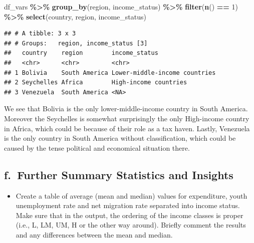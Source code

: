 \documentclass[
]{article}
\newenvironment{Shaded}{\begin{snugshade}}{\end{snugshade}}
\newcommand{\DecValTok}[1]{\textcolor[rgb]{0.00,0.00,0.81}{#1}}
\newcommand{\FunctionTok}[1]{\textcolor[rgb]{0.13,0.29,0.53}{\textbf{#1}}}
\newcommand{\NormalTok}[1]{#1}
\newcommand{\SpecialCharTok}[1]{\textcolor[rgb]{0.81,0.36,0.00}{\textbf{#1}}}
\providecommand{\tightlist}{%
  \setlength{\itemsep}{0pt}\setlength{\parskip}{0pt}}
\begin{document}
\begin{Shaded}
\begin{Highlighting}[]
\NormalTok{df\_vars }\SpecialCharTok{\%\textgreater{}\%} 
  \FunctionTok{group\_by}\NormalTok{(region, income\_status) }\SpecialCharTok{\%\textgreater{}\%}
  \FunctionTok{filter}\NormalTok{(}\FunctionTok{n}\NormalTok{() }\SpecialCharTok{==} \DecValTok{1}\NormalTok{) }\SpecialCharTok{\%\textgreater{}\%}
  \FunctionTok{select}\NormalTok{(country, region, income\_status)}
\end{Highlighting}
\end{Shaded}

\begin{verbatim}
## # A tibble: 3 x 3
## # Groups:   region, income_status [3]
##   country    region        income_status                
##   <chr>      <chr>         <chr>                        
## 1 Bolivia    South America Lower-middle-income countries
## 2 Seychelles Africa        High-income countries        
## 3 Venezuela  South America <NA>
\end{verbatim}

We see that Bolivia is the only lower-middle-income country in South
America. Moreover the Seychelles is somewhat surprisingly the only
High-income country in Africa, which could be because of their role as a
tax haven. Lastly, Venezuela is the only country in South America
without classification, which could be caused by the tense political and
economical situation there.

\subsection{f.~Further Summary Statistics and
Insights}\label{f.-further-summary-statistics-and-insights}

\begin{itemize}
\tightlist
\item
  Create a table of average (mean and median) values for expenditure,
  youth unemployment rate and net migration rate separated into income
  status. Make sure that in the output, the ordering of the income
  classes is proper (i.e., L, LM, UM, H or the other way around).
  Briefly comment the results and any differences between the mean and
  median.
\end{itemize}
\end{document}
